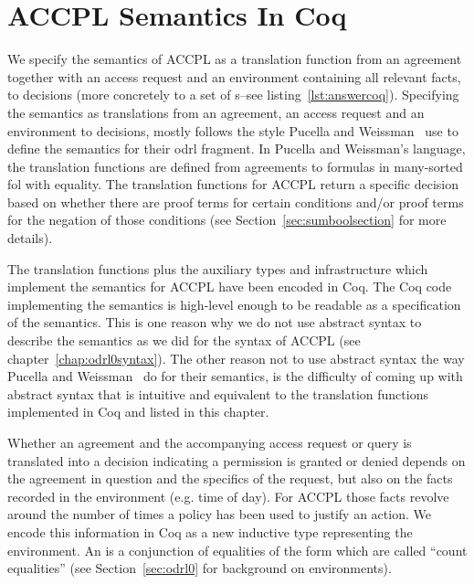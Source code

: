 \chapter{ACCPL Semantics In Coq}\label{chap:accplsemanticscoq}

We specify the semantics of \ac{ACCPL} as a translation function from an agreement together with an access request and an environment containing all relevant facts, to decisions (more concretely to a set of s--see listing~\ref{lst:answercoq}). Specifying the semantics as translations from an agreement, an access request and an environment to decisions, mostly follows the style Pucella and Weissman~\cite{pucella2006} use to define the semantics for their \ac{odrl} fragment. In Pucella and Weissman's language, the translation functions are defined from agreements to formulas in many-sorted \ac{fol} with equality. The translation functions for \ac{ACCPL} return a specific decision based on whether there are proof terms for certain conditions and/or proof terms for the negation of those conditions (see Section~\ref{sec:sumboolsection} for more details).
 

The translation functions plus the auxiliary types and infrastructure which implement the semantics for \ac{ACCPL} have been encoded in Coq. The Coq code implementing the semantics is high-level enough to be readable as a specification of the semantics. This is one reason why we do not use abstract syntax to describe the semantics as we did for the syntax of \ac{ACCPL} (see chapter~\ref{chap:odrl0syntax}). The other reason not to use abstract syntax the way Pucella and Weissman~\cite{pucella2006} do for their semantics, is the difficulty of coming up with abstract syntax that is intuitive and equivalent to the translation functions implemented in Coq and listed in this chapter.

Whether an agreement and the accompanying access request or query is translated into a decision indicating a permission is granted or denied depends on the agreement in question and the specifics of the request, but also on the facts recorded in the environment (e.g. time of day). For \ac{ACCPL} those facts revolve around the number of times a policy has been used to justify an action. We encode this information in Coq as a new inductive type representing the environment. An  is a conjunction of equalities of the form  which are called ``count equalities'' (see Section~\ref{sec:odrl0} for background on environments).

